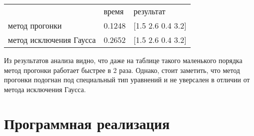 \documentclass{article}
\begin{document}
\begin{table}[!h]
\begin{tabular}{lll}
~                       & время  & результат \\
метод прогонки          & 0.1248 & [1.5 2.6 0.4 3.2]\\
метод исключения Гаусса & 0.2652 & [1.5 2.6 0.4 3.2]\\
\end{tabular}
\end{table}

Из результатов анализа видно, что даже на таблице такого маленького порядка
метод прогонки работает быстрее в 2 раза.
Однако, стоит заметить, что метод прогонки подогнан под специальный тип
уравнений и не уверсален в отличии от метода исключения Гаусса.

\section{Программная реализация}
\end{document}
